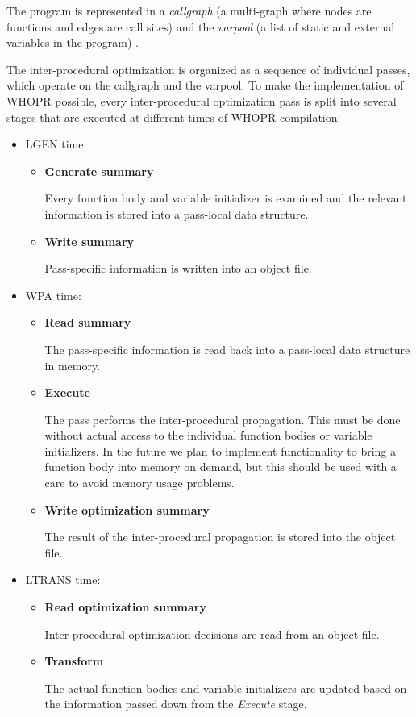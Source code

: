 \documentclass[final]{ols}
\begin{document}
The program is represented in a {\em callgraph} (a multi-graph
where nodes are functions and edges are call sites) and the {\em varpool} (a list of
static and external variables in the program) \cite{callgraph}.

The inter-procedural optimization is organized as a sequence of individual passes, which
operate on the callgraph and the varpool.  To make the implementation of WHOPR possible,
every inter-procedural optimization pass is split into several stages that are executed at
different times of WHOPR compilation:
\begin{itemize}
\item LGEN time:
\begin{itemize}
\item[1.] {\bf Generate summary}

Every function body and variable initializer is examined
and the relevant information is stored into a pass-local data structure.
\item[2.] {\bf Write summary}

Pass-specific information is written into an object
file.
\end{itemize}
\item WPA time:
\begin{itemize}
\item[3.] {\bf Read summary}

The pass-specific information is read back into
a pass-local data structure in memory.
\item[4.] {\bf Execute}

The pass performs the inter-procedural propagation. This
must be done without actual access to the individual function bodies or variable
initializers.  In the future we plan to implement functionality to bring
a function body into memory on demand, but this should be used with a care
to avoid memory usage problems.
\item[5.] {\bf Write optimization summary}

The result of the inter-procedural propagation
is stored into the object file.
\end{itemize}
\item LTRANS time:
\begin{itemize}
\item[6.] {\bf Read optimization summary}

Inter-procedural optimization decisions
are read from an object file.
\item[7.] {\bf Transform}

The actual function bodies and variable initializers are updated
based on the information passed down from the {\em Execute} stage.
\end{itemize}
\end{itemize}
\end{document}
